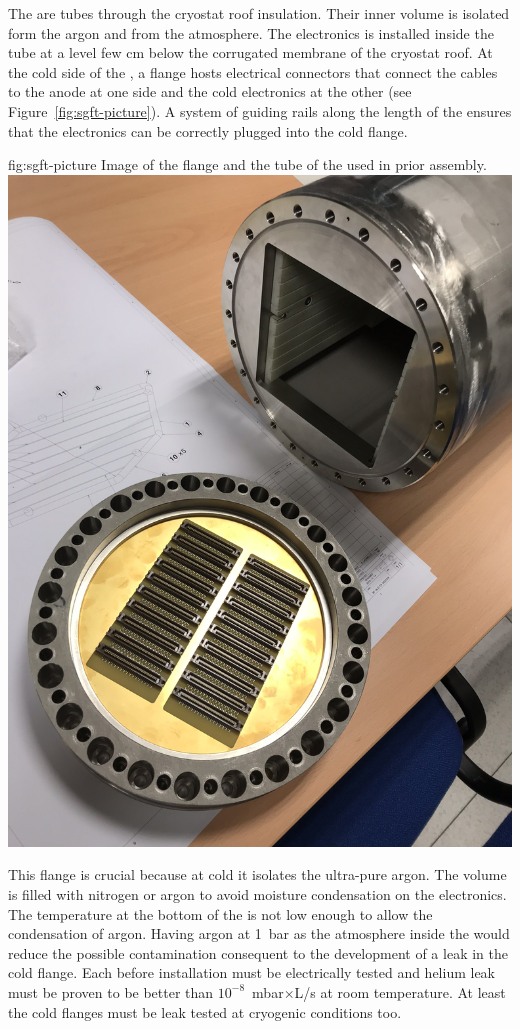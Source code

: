 The  are tubes through the cryostat roof insulation.
Their inner volume is isolated form the argon and from the atmosphere.
The electronics is installed inside the tube at a level few cm below the corrugated membrane of the cryostat roof.
At the cold side of the , a flange hosts electrical connectors that connect the cables to the anode at one side and the cold electronics at the other (see Figure~\ref{fig:sgft-picture}).
A system of guiding rails along the length of the  ensures that the electronics can be correctly plugged into the cold flange.
\begin{dunefigure}{fig:sgft-picture}
{Image of the flange and the tube of the  used in  prior assembly.}
\includegraphics[width=.5\textwidth]{graphics/sgft-picture.jpg}
\end{dunefigure}
This flange is crucial because at cold it isolates the ultra-pure argon.
The  volume is filled with nitrogen or argon to avoid moisture condensation on the electronics.
The temperature at the bottom of the  is not low enough to allow the condensation of argon.
Having argon at 1~bar as the atmosphere inside the  would reduce the possible  contamination consequent to the development of a leak in the cold flange.
Each  before installation must be electrically tested and helium leak must be proven to be better than $10^{-8}$~mbar$\times$L/s at room temperature.
At least the cold flanges must be leak tested at cryogenic conditions too.



